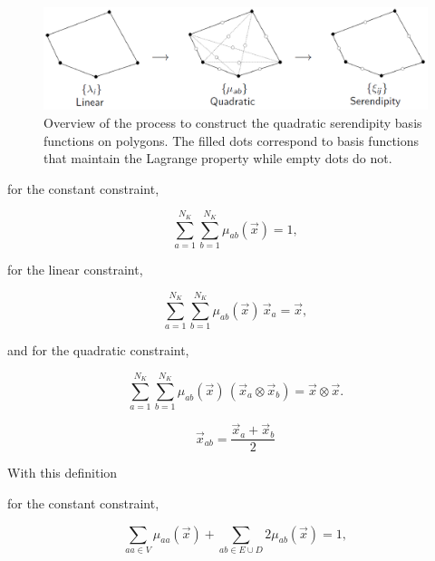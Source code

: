 \begin{figure}[hbt]
\centering
\includegraphics[width=\textwidth]{figures/sec_BF/linear_to_quad_process.png}
\caption{Overview of the process to construct the quadratic serendipity basis functions on polygons. The filled dots correspond to basis functions that maintain the Lagrange property while empty dots do not.}
\label{fig::BF_2D_quad_process}
\end{figure}

for the constant constraint,

\begin{equation}
\label{eq::BF_quad_interp_req_constant}
\sum_{a=1}^{ N_K} \sum_{b=1}^{ N_K}  \mu_{ab} (\vec{x})  = 1 ,
\end{equation}

\noindent for the linear constraint,

\begin{equation}
\label{eq::BF_quad_interp_req_linear}
\sum_{a=1}^{ N_K} \sum_{b=1}^{ N_K} \mu_{ab} (\vec{x}) \, \vec{x}_a   = \vec{x} ,
\end{equation}

\noindent and for the quadratic constraint,

\begin{equation}
\label{eq::BF_quad_interp_req_quadratic}
\sum_{a=1}^{ N_K} \sum_{b=1}^{ N_K}  \mu_{ab} (\vec{x}) \, \left( \vec{x}_a \otimes \vec{x}_b \right) =  \vec{x} \otimes \vec{x} .
\end{equation}


\begin{equation}
\label{eq::BF_Quad_abbrev_pos}
\vec{x}_{ab} = \frac{\vec{x}_a + \vec{x}_b}{2}
\end{equation}

\noindent With this definition 

for the constant constraint,

\begin{equation}
\label{eq::BF_quad_interp_req_constant_alt}
\sum_{aa \in V}  \mu_{aa} (\vec{x}) + \sum_{ab \in E \cup D} 2 \mu_{ab} (\vec{x})  = 1 ,
\end{equation}

